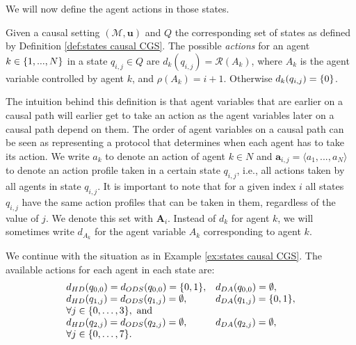 We will now define the agent actions in those states.

\begin{definition}\label{def:actions causal CGS}
    Given a causal setting $(\mathcal{M},\mathbf{u})$ and $Q$ the corresponding set of states as defined by Definition \ref{def:states causal CGS}. The possible \emph{actions} for an agent $k \in \{ {1,...,N} \}$ in a state $q_{i,j} \in Q$ are $d_k(q_{i,j}) = \mathcal{R}(A_k)$, where $A_k$ is the agent variable controlled by agent $k$, and $\rho(A_k) = i+1$. Otherwise $d_k(q_{i,j}) = \{ {0} \}$.
\end{definition}

The intuition behind this definition is that agent variables that are earlier on a causal path will earlier get to take an action as the agent variables later on a causal path depend on them. The order of agent variables on a causal path can be seen as representing a protocol that determines when each agent has to take its action.   
We write $a_k$ to denote an action of agent $k \in N$ and $\mathbf{a}_{i,j} = \langle a_1,...,a_N\rangle$ to denote an action profile taken in a certain state $q_{i,j}$, i.e., all actions taken by all agents in state $q_{i,j}$. It is important to note that for a given index $i$ all states $q_{i,j}$ have the same action profiles that can be taken in them, regardless of the value of $j$. We denote this set with $\mathbf{A}_i$. 
Instead of $d_k$ for agent $k$, we will sometimes write $d_{A_k}$ for the agent variable $A_k$ corresponding to agent $k$.

\begin{example}\label{ex:actions causal CGS}
    We continue with the situation as in Example \ref{ex:states causal CGS}.
    The available actions for each agent in each state are: \begin{equation*}
        \begin{array}{ll}
            d_{{HD}}(q_{0,0}) = d_{{ODS}}(q_{0,0}) = \{ {0,1} \}, & d_{{DA}}(q_{0,0}) = \emptyset, \\
            d_{{HD}}(q_{1,j}) = d_{{ODS}}(q_{1,j}) = \emptyset,  & d_{{DA}}(q_{1,j}) = \{ {0,1} \}, \\
            \forall j \in \{ {0,\ldots,3} \},  \text{ and} & \\
            d_{{HD}}(q_{2,j}) = d_{{ODS}}(q_{2,j}) = \emptyset,  & d_{{DA}}(q_{2,j}) = \emptyset, \\
            \forall j \in \{ {0,\ldots,7} \}.&
        \end{array}
    \end{equation*}
\end{example}


